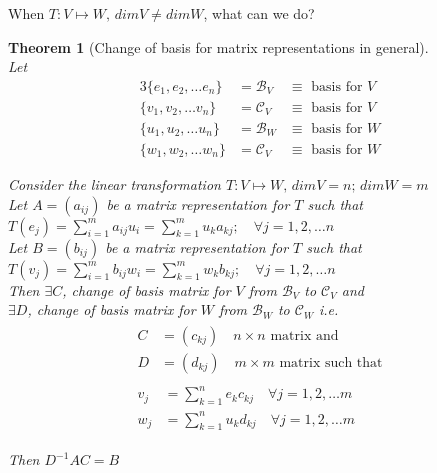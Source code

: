 \documentclass[twoside]{amsart}
\theoremstyle{plain}
\newtheorem{theorem}{Theorem}
\theoremstyle{definition}
\begin{document}
When $T:V \mapsto W, \, dim V \neq dim W$, what can we do?

\begin{theorem}[Change of basis for matrix representations in general]\label{T:Change_of_basis_for_Matrix_Representations_general} \quad \\
Let 
\begin{alignat*}{3}
\{ e_1,e_2, \dots e_n\} & = \mathcal{B}_V & \equiv \text{ basis for } V \\
\{ v_1,v_2, \dots v_n\} & = \mathcal{C}_V & \equiv \text{ basis for } V \\
\{ u_1,u_2, \dots u_n\} & = \mathcal{B}_W & \equiv \text{ basis for } W \\
\{ w_1,w_2, \dots w_n\} & = \mathcal{C}_V & \equiv \text{ basis for } W 
\end{alignat*}

Consider the linear transformation $T:V\mapsto W, \, dim V = n; \, dim W = m$  \\
Let $A = (a_{ij})$ be a matrix representation for $T$ such that \\
\phantom{Let} $T(e_j) = \sum_{i=1}^m a_{ij} u_i = \sum_{k=1}^m u_k a_{kj}; \quad \forall j = 1,2,\dots n$ \\
Let $B = (b_{ij})$ be a matrix representation for $T$ such that \\
\phantom{Let} $T(v_j) = \sum_{i=1}^m b_{ij} w_i = \sum_{k=1}^m w_k b_{kj}; \quad \forall j = 1,2,\dots n$ \\
\bigskip
Then $\exists C$, change of basis matrix for $V$ from $\mathcal{B}_V$ to $\mathcal{C}_V$ and \\
\phantom{Then} $\exists D$, change of basis matrix for $W$ from $\mathcal{B}_W$ to $\mathcal{C}_W$ i.e.
\medskip
\begin{gather*}
  \begin{aligned}
C &= (c_{kj}) \quad n \times n \text{ matrix and } \\
D &= (d_{kj}) \quad m \times m \text{ matrix such that}  
  \end{aligned}
\\
\begin{aligned}
v_j & = \sum_{k=1}^n e_k c_{kj} \quad \forall j = 1,2,\dots m \\
w_j & = \sum_{k=1}^n u_k d_{kj} \quad \forall j = 1,2, \dots m 
\end{aligned}
\end{gather*}

Then $D^{-1}AC = B$
\end{theorem}
\end{document}

